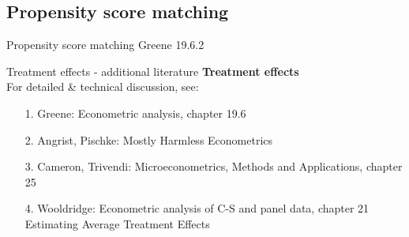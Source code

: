 \documentclass{beamer}
\begin{document}

\subsection{Propensity score matching}
\begin{frame}{Propensity score matching}
    Greene 19.6.2
\end{frame}





\begin{frame}{Treatment effects - additional literature}
\textbf{Treatment effects}\\
\medskip
For detailed \& technical discussion, see:\\
\medskip
\begin{itemize}
\item[1.] Greene: Econometric analysis, chapter 19.6
\medskip
\item[2.] Angrist, Pischke: Mostly Harmless Econometrics
\medskip
\item[3.] Cameron, Trivendi: Microeconometrics, Methods and Applications, chapter 25
\medskip
\item[4.] Wooldridge: Econometric analysis of C-S and panel data, chapter 21 Estimating Average Treatment Effects
\end{itemize}
\end{frame}
\end{document}
